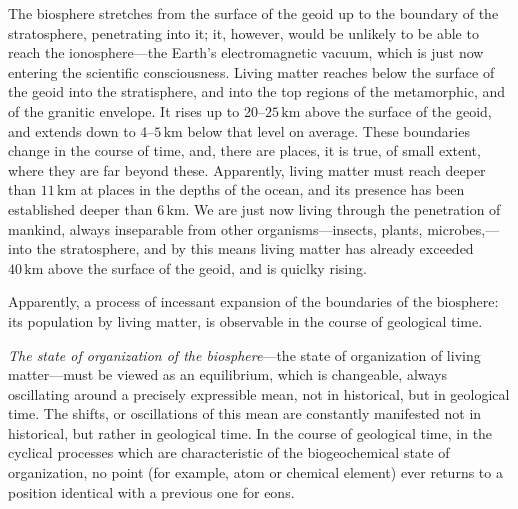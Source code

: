 The biosphere stretches from the surface of the geoid up to the boundary of the
stratosphere, penetrating into it; it, however, would be unlikely to be able to
reach the ionosphere---the Earth's electromagnetic vacuum, which is just now
entering the scientific consciousness.  Living matter reaches below the surface
of the geoid into the stratisphere, and into the top regions of the
metamorphic, and of the granitic envelope.  It rises up to
20--$25\,\mathrm{km}$ above the surface of the geoid, and extends down to
4--$5\,\mathrm{km}$ below that level on average.  These boundaries change in
the course of time, and, there are places, it is true, of small extent, where
they are far beyond these.  Apparently, living matter must reach deeper than
$11\,\mathrm{km}$ at places in the depths of the ocean, and its presence has
been established deeper than $6\,\mathrm{km}$.  We are just now living through the penetration of mankind, always
inseparable from other organisms---insects, plants, microbes,---into the
stratosphere, and by this means living matter has already exceeded
$40\,\mathrm{km}$ above the surface of the geoid, and is quiclky rising.

Apparently, a process of incessant expansion of the boundaries of the
biosphere: its population by living matter, is observable in the course of
geological time.


\Section %
\emph{The state of organization of the biosphere}---the state of organization
of living matter---must be viewed as an equilibrium, which is changeable,
always oscillating around a precisely expressible mean, not in historical, but
in geological time.  The shifts, or oscillations of this mean are constantly
manifested not in historical, but rather in geological time.  In the course of
geological time, in the cyclical processes which are characteristic of the
biogeochemical state of organization, no point (for example, atom or chemical
element) ever returns to a position identical with a previous one for eons.

